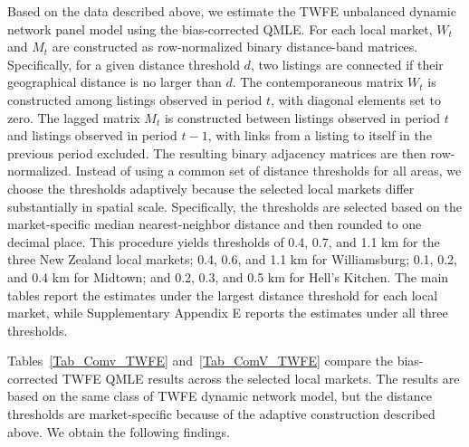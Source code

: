 \documentclass[11pt,a4paper]{article}
\begin{document}
Based on the data described above, we estimate the TWFE unbalanced dynamic network panel model using the bias-corrected QMLE. For each local market, $W_t$ and $M_t$ are constructed as row-normalized binary distance-band matrices. Specifically, for a given distance threshold $d$, two listings are connected if their geographical distance is no larger than $d$. The contemporaneous matrix $W_t$ is constructed among listings observed in period $t$, with diagonal elements set to zero. The lagged matrix $M_t$ is constructed between listings observed in period $t$ and listings observed in period $t-1$, with links from a listing to itself in the previous period excluded. The resulting binary adjacency matrices are then row-normalized.
Instead of using a common set of distance thresholds for all areas, we choose the thresholds adaptively because the selected local markets differ substantially in spatial scale.
Specifically, the thresholds are selected based on the market-specific median nearest-neighbor distance and then rounded to one decimal place. This procedure yields thresholds of 0.4, 0.7, and 1.1 km for the three New Zealand local markets; 0.4, 0.6, and 1.1 km for Williamsburg; 0.1, 0.2, and 0.4 km for Midtown; and 0.2, 0.3, and 0.5 km for Hell's Kitchen. The main tables report the estimates under the largest distance threshold for each local market, while Supplementary Appendix E reports the estimates under all three thresholds.

Tables~\ref{Tab_Comv_TWFE} and~\ref{Tab_ComV_TWFE} compare the bias-corrected TWFE QMLE results across the selected local markets. The results are based on the same class of TWFE dynamic network model, but the distance thresholds are market-specific because of the adaptive construction described above. We obtain the following findings.
\end{document}
